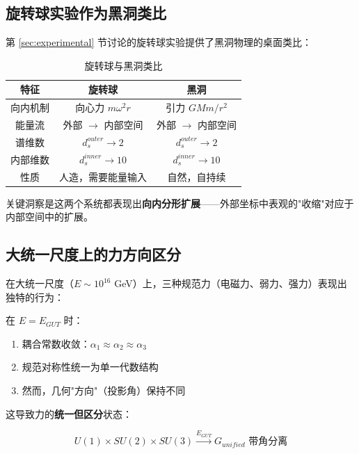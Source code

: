 \subsection{旋转球实验作为黑洞类比}

第 \ref{sec:experimental} 节讨论的旋转球实验提供了黑洞物理的桌面类比：

\begin{table}[htbp]
\centering
\caption{旋转球与黑洞类比}
\begin{tabular}{@{}ccc@{}}
\toprule
特征 & 旋转球 & 黑洞 \\
\midrule
向内机制 & 向心力 $m\omega^2 r$ & 引力 $GMm/r^2$ \\
能量流 & 外部 $\to$ 内部空间 & 外部 $\to$ 内部空间 \\
谱维数 & $d_s^{outer} \to 2$ & $d_s^{outer} \to 2$ \\
内部维数 & $d_s^{inner} \to 10$ & $d_s^{inner} \to 10$ \\
性质 & 人造，需要能量输入 & 自然，自持续 \\
\bottomrule
\end{tabular}
\label{tab:sphere_bh_analogy}
\end{table}

关键洞察是这两个系统都表现出\textbf{向内分形扩展}——外部坐标中表观的"收缩"对应于内部空间中的扩展。

\subsection{大统一尺度上的力方向区分}

在大统一尺度（$E \sim 10^{16}$ GeV）上，三种规范力（电磁力、弱力、强力）表现出独特的行为：

\begin{theorem}[统一但区分]
在 $E = E_{GUT}$ 时：
\begin{enumerate}
    \item 耦合常数收敛：$\alpha_1 \approx \alpha_2 \approx \alpha_3$
    \item 规范对称性统一为单一代数结构
    \item 然而，几何"方向"（投影角）保持不同
\end{enumerate}
\end{theorem}

这导致力的\textbf{统一但区分}状态：

\begin{equation}
    U(1) \times SU(2) \times SU(3) \xrightarrow{E_{GUT}} G_{unified} \text{ 带角分离}
\end{equation}

